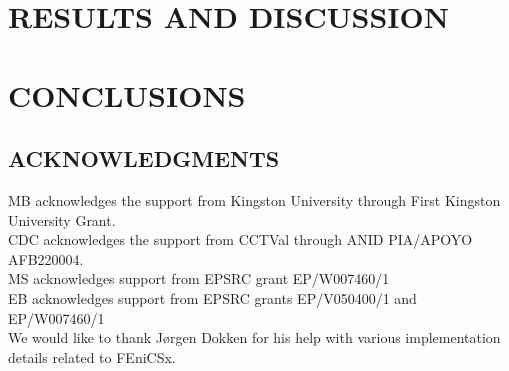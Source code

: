 \documentclass[12pt]{article}
\begin{document}
\section*{\sffamily \Large RESULTS AND DISCUSSION}


 








\section*{\sffamily \Large CONCLUSIONS}




\subsection*{\sffamily \large ACKNOWLEDGMENTS}
MB acknowledges the support from Kingston University through First Kingston University Grant. \\
CDC acknowledges the support from CCTVal through ANID PIA/APOYO AFB220004.\\
MS acknowledges support from EPSRC grant EP/W007460/1 \\
EB acknowledges support from EPSRC grants EP/V050400/1 and EP/W007460/1 \\
We would like to thank J{\o}rgen Dokken for his help with various implementation details related to FEniCSx.
\end{document}
